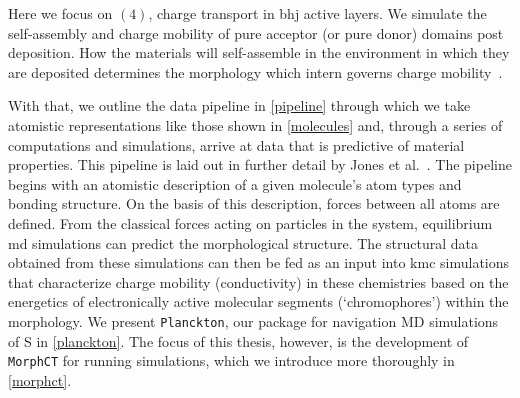 
Here we focus on $(4)$, charge transport in \gls{bhj} active layers.
We simulate the self-assembly and charge mobility of pure acceptor (or
pure donor) domains post deposition. 
How the materials will self-assemble in the environment in which they are deposited determines
the morphology which intern governs charge mobility~\cite{Vanlaeke2006}\cite{McMahon2011}. 

With that, we outline the data pipeline in \autoref{pipeline} through which we take atomistic representations like
those shown in \autoref{molecules} and, through a series of computations and simulations,
arrive at data that is predictive of material properties. 
This pipeline is laid out in further detail by Jones et al.~\cite{Jones2017}.
The pipeline begins with an atomistic description of a given molecule's atom types and bonding structure.
On the basis of this description, forces between all atoms are defined. From the classical forces acting on
particles in the system,  equilibrium \gls{md} simulations can predict the morphological structure. 
The structural data obtained from these simulations can then be fed as an input into \gls{kmc}
simulations that characterize charge mobility (conductivity) in these chemistries based on the
energetics of electronically active molecular segments (`chromophores') within the morphology.
We present \texttt{Planckton}, our package for navigation MD simulations of S in \autoref{planckton}. 
The focus of this thesis, however, is the development of \texttt{MorphCT} for running  simulations, which we
introduce more thoroughly in \autoref{morphct}.

